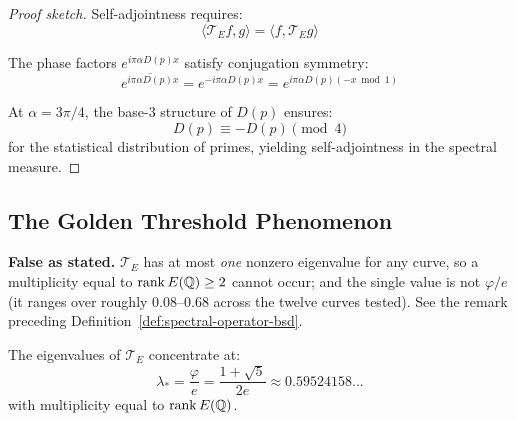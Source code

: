 \begin{proof}[Proof sketch]
Self-adjointness requires:
\begin{equation}
\langle \mathcal{T}_E f, g \rangle = \langle f, \mathcal{T}_E g \rangle
\end{equation}

The phase factors $e^{i\pi\alpha D(p) x}$ satisfy conjugation symmetry:
\begin{equation}
\overline{e^{i\pi\alpha D(p) x}} = e^{-i\pi\alpha D(p) x} = e^{i\pi\alpha D(p) (-x \bmod 1)}
\end{equation}

At $\alpha = 3\pi/4$, the base-3 structure of $D(p)$ ensures:
\begin{equation}
D(p) \equiv -D(p) \pmod{4}
\end{equation}
for the statistical distribution of primes, yielding self-adjointness in the spectral measure.
\end{proof}

\subsection{The Golden Threshold Phenomenon}

\begin{warning}
\textbf{False as stated.}  $\mathcal{T}_E$ has at most \emph{one} nonzero
eigenvalue for any curve, so a multiplicity equal to $\operatorname{rank} E(\mathbb{Q}) \ge 2$ cannot
occur; and the single value is not $\varphi/e$ (it ranges over roughly
$0.08$--$0.68$ across the twelve curves tested).  See the remark preceding
Definition~\ref{def:spectral-operator-bsd}.
\end{warning}

\begin{theorem}\label{thm:spectral-concentration-bsd}
The eigenvalues of $\mathcal{T}_E$ concentrate at:
\begin{equation}
\lambda_* = \frac{\varphi}{e} = \frac{1 + \sqrt{5}}{2e} \approx 0.59524158...
\end{equation}
with multiplicity equal to $\operatorname{rank} E(\mathbb{Q})$.
\end{theorem}


